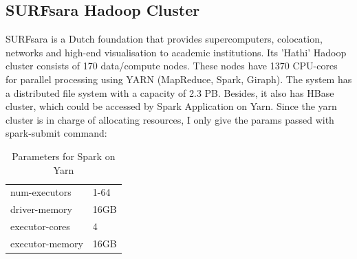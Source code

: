 \subsection{SURFsara Hadoop Cluster}
SURFsara is a Dutch foundation that provides supercomputers, colocation, networks and high-end visualisation to academic institutions. Its 'Hathi' Hadoop cluster consists of 170 data/compute nodes. These nodes have 1370 CPU-cores for parallel processing using YARN (MapReduce, Spark, Giraph). The system has a distributed file system with a capacity of 2.3 PB. Besides, it also has HBase cluster, which could be accessed by Spark Application on Yarn. Since the yarn cluster is in charge of allocating resources, I only give the params passed with spark-submit command:
\begin{table}[h!]
\centering
\caption{Parameters for Spark on Yarn}
\label{my-label}
\begin{tabular}{ll}
num-executors   & 1-64 \\
driver-memory   & 16GB \\
executor-cores  & 4    \\
executor-memory & 16GB
\end{tabular}
\end{table}
